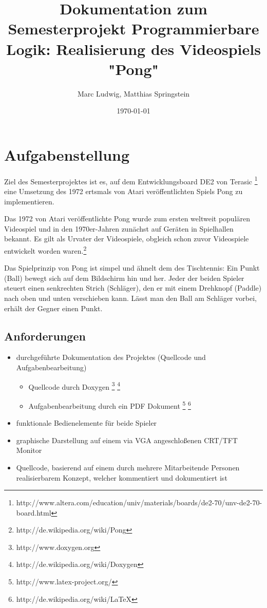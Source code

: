 \documentclass{article}
\title{Dokumentation zum Semesterprojekt Programmierbare Logik: Realisierung des Videospiels "Pong"}
\author{Marc Ludwig, Matthias Springstein}
\date{\today}
\begin{document}
\tableofcontents
\newpage

\section{Aufgabenstellung}
Ziel des Semesterprojektes ist es, auf dem Entwicklungsboard DE2 von Terasic 
\footnote{http://www.altera.com/education/univ/materials/boards/de2-70/unv-de2-70-board.html}
eine Umsetzung des 1972 ertsmals von Atari veröffentlichten Spiels Pong zu implementieren.

Das 1972 von Atari veröffentlichte Pong wurde zum ersten weltweit populären Videospiel und in den 
1970er-Jahren zunächst auf Geräten in Spielhallen bekannt. Es gilt als Urvater der Videospiele, 
obgleich schon zuvor Videospiele entwickelt worden waren.\footnote{http://de.wikipedia.org/wiki/Pong}

Das Spielprinzip von Pong ist simpel und ähnelt dem des Tischtennis: Ein Punkt (Ball) bewegt sich 
auf dem Bildschirm hin und her. Jeder der beiden Spieler steuert einen senkrechten Strich 
(Schläger), den er mit einem Drehknopf (Paddle) nach oben und unten verschieben kann. Lässt man 
den Ball am Schläger vorbei, erhält der Gegner einen Punkt.


\subsection{Anforderungen}
\begin{itemize}
  \item durchgeführte Dokumentation des Projektes (Quellcode und Aufgabenbearbeitung)
  	\begin{itemize} 
  	\item Quellcode durch Doxygen 
  		\footnote{http://www.doxygen.org} 
  		\footnote{http://de.wikipedia.org/wiki/Doxygen}
  	\item Aufgabenbearbeitung durch ein PDF Dokument
  		\footnote{http://www.latex-project.org/}
  		\footnote{http://de.wikipedia.org/wiki/LaTeX}
  	\end{itemize} 
  \item funktionale Bedienelemente für beide Spieler
  \item graphische Darstellung auf einem via VGA angeschloßenen CRT/TFT Monitor
  \item Quellcode, basierend auf einem durch mehrere Mitarbeitende Personen realisierbarem Konzept, 
  		welcher kommentiert und dokumentiert ist
\end{itemize}
\end{document}
